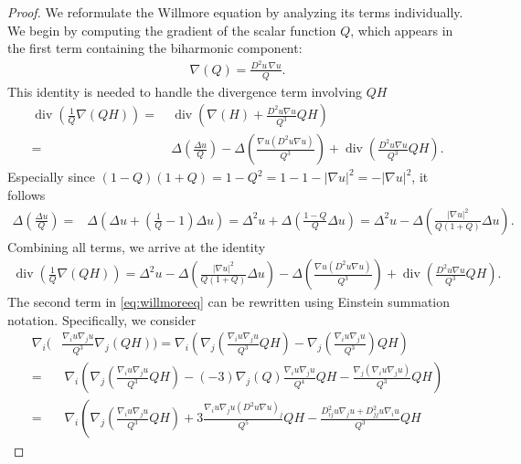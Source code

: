 \documentclass[12pt,a4paper,twoside]{article}
\renewcommand{\div}{\operatorname{div}}
\begin{document}
\begin{proof}
We reformulate the Willmore equation by analyzing its terms individually. We begin by computing the gradient of the scalar function $Q$, which appears in the first term containing the biharmonic component:
\begin{align*}
    \nabla (Q)= \frac{D^2u \, \nabla u}{Q}.
\end{align*}
This identity is needed to handle the divergence term involving $QH$
\begin{align*}
    \div\left( \frac{1}{Q} \nabla (Q H) \right) 
    =&\  \div\left(  \nabla ( H) + \frac{D^2u \nabla u}{Q^3} QH \right) \\
    = &\ \Delta \left( \frac{\Delta u }{Q} \right) - \Delta \left( \frac{\nabla u (D^2 u \nabla u)}{Q^3} \right)  +\div\left( \frac{D^2u \nabla u}{Q^3} QH  \right).
\end{align*}
Especially since $(1-Q)(1+Q)=1-Q^2 = 1-1-|\nabla u|^2= -|\nabla u|^2$, it follows
\begin{align*}
\Delta \left( \frac{\Delta u }{Q} \right)   =& \Delta \left( \Delta u+\left(\frac{1}{Q}-1\right)\Delta u \right) = 
\Delta ^2 u +\Delta \left(\frac{1-Q}{Q}\Delta u \right) =
\Delta ^2 u - \Delta \left( \frac{|\nabla u|^2}{Q(1+Q)}\Delta u  \right).
\end{align*}
Combining all terms, we arrive at the identity
\begin{align*}
        \div\left( \frac{1}{Q} \nabla (Q H) \right) 
    = \Delta ^2 u - \Delta \left( \frac{|\nabla u|^2}{Q(1+Q)}\Delta u  \right) - \Delta \left( \frac{\nabla u (D^2 u \nabla u)}{Q^3} \right)  +\div\left( \frac{D^2u \nabla u}{Q^3} QH  \right).
\end{align*}
The second term in \eqref{eq:willmoreeq} can be rewritten using Einstein summation notation. Specifically, we consider
\begin{align*}
 \nabla_i\Bigg( & \frac{\nabla_i u \nabla _j u}{Q^3}  \nabla_j (Q H) \Bigg) 
    = \nabla_i\left( \nabla_j \left( \frac{\nabla_i u \nabla _j u}{Q^3}Q H \right)
     -\nabla_j\left( \frac{\nabla_i u \nabla _j u}{Q^3} \right)  Q H 
     \right)  \\
     =&\  \nabla_i\left( \nabla_j \left( \frac{\nabla_i u \nabla _j u}{Q^3}Q H \right)
     -(-3)\nabla_j (Q) \frac{\nabla_i u \nabla _j u}{Q^4}   Q H 
     - \frac{\nabla_j(\nabla_i u \nabla _j u)}{Q^3}   Q H 
     \right)  \\
     =&\  \nabla_i\left( \nabla_j \left( \frac{\nabla_i u \nabla _j u}{Q^3}Q H \right)
     + 3  \frac{\nabla_i u \nabla _j u (D^2u \nabla u)_j }{Q^5}Q H  -   \frac{D^2_{ij} u \nabla _j u +D^2_{jj} u \nabla _i u }{Q^3}Q H 

\end{align*}
\end{proof}
\end{document}
